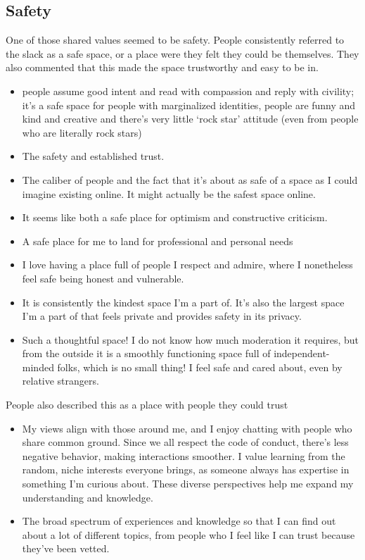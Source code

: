 \documentclass[
]{book}
\providecommand{\tightlist}{%
  \setlength{\itemsep}{0pt}\setlength{\parskip}{0pt}}
\begin{document}
\subsection{Safety}\label{safety}

One of those shared values seemed to be safety. People consistently referred to the slack as a safe space, or a place were they felt they could be themselves. They also commented that this made the space trustworthy and easy to be in.

\begin{itemize}
\tightlist
\item
  people assume good intent and read with compassion and reply with civility; it's a safe space for people with marginalized identities, people are funny and kind and creative and there's very little `rock star' attitude (even from people who are literally rock stars)
\item
  The safety and established trust.
\item
  The caliber of people and the fact that it's about as safe of a space as I could imagine existing online. It might actually be the safest space online.
\item
  It seems like both a safe place for optimism and constructive criticism.
\item
  A safe place for me to land for professional and personal needs
\item
  I love having a place full of people I respect and admire, where I nonetheless feel safe being honest and vulnerable.
\item
  It is consistently the kindest space I'm a part of. It's also the largest space I'm a part of that feels private and provides safety in its privacy.
\item
  Such a thoughtful space! I do not know how much moderation it requires, but from the outside it is a smoothly functioning space full of independent-minded folks, which is no small thing! I feel safe and cared about, even by relative strangers.
\end{itemize}

People also described this as a place with people they could trust

\begin{itemize}
\tightlist
\item
  My views align with those around me, and I enjoy chatting with people who share common ground. Since we all respect the code of conduct, there's less negative behavior, making interactions smoother. I value learning from the random, niche interests everyone brings, as someone always has expertise in something I'm curious about. These diverse perspectives help me expand my understanding and knowledge.
\item
  The broad spectrum of experiences and knowledge so that I can find out about a lot of different topics, from people who I feel like I can trust because they've been vetted.
\end{itemize}
\end{document}
